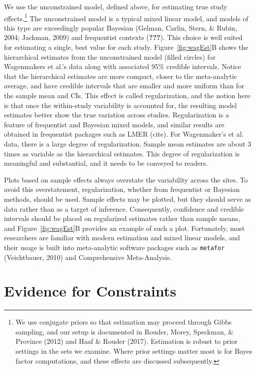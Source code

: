 \documentclass[english,man]{apa6}
\theoremstyle{definition}
\theoremstyle{definition}
\theoremstyle{remark}
\begin{document}
We use the unconstrained model, defined above, for estimating true study
effects.\footnote{We use conjugate priors so that estimation may proceed
  through Gibbs sampling, and our setup is documented in Rouder, Morey,
  Speckman, \& Province (2012) and Haaf \& Rouder (2017). Estimation is
  robust to prior settings in the sets we examine. Where prior settings
  matter most is for Bayes factor computations, and these effects are
  discussed subsequently.} The unconstrained model is a typical mixed
linear model, and models of this type are exceedingly popular Bayesian
(Gelman, Carlin, Stern, \& Rubin, 2004; Jackman, 2009) and frequentist
contexts ({\textbf{???}}). This choice is well suited for estimating a
single, best value for each study. Figure~\ref{fig:wagEst}B shows the
hierarchical estimates from the unconstrained model (filled circles) for
Wagenmakers et al.'s data along with associated 95\% credible intervals.
Notice that the hierarchical estimates are more compact, closer to the
meta-analytic average, and have credible intervals that are smaller and
more uniform than for the sample mean and CIs. This effect is called
regularization, and the notion here is that once the within-study
variability is accounted for, the resulting model estimates better show
the true variation across studies. Regularization is a feature of
frequentist and Bayesian mixed models, and similar results are obtained
in frequentist packages such as LMER (cite). For Wagenmaker's et al.
data, there is a large degree of regularization. Sample mean estimates
are about 3 times as variable as the hierarchical estimates. This degree
of regularization is meaningful and substantial, and it needs to be
conveyed to readers.

Plots based on sample effects always overstate the variability across
the sites. To avoid this overstatement, regularization, whether from
frequentist or Bayesian methods, should be used. Sample effects may be
plotted, but they should serve as data rather than as a target of
inference. Consequently, confidence and credible intervals should be
placed on regularized estimates rather than sample means, and
Figure~\ref{fig:wagEst}B provides an example of such a plot.
Fortunately, most researchers are familiar with modern estimation and
mixed linear models, and their usage is built into meta-analytic
software packages such as \texttt{metafor} (Veichtbauer, 2010) and
Comprehensive Meta-Analysis.

\section{Evidence for Constraints}\label{evidence-for-constraints}
\end{document}
